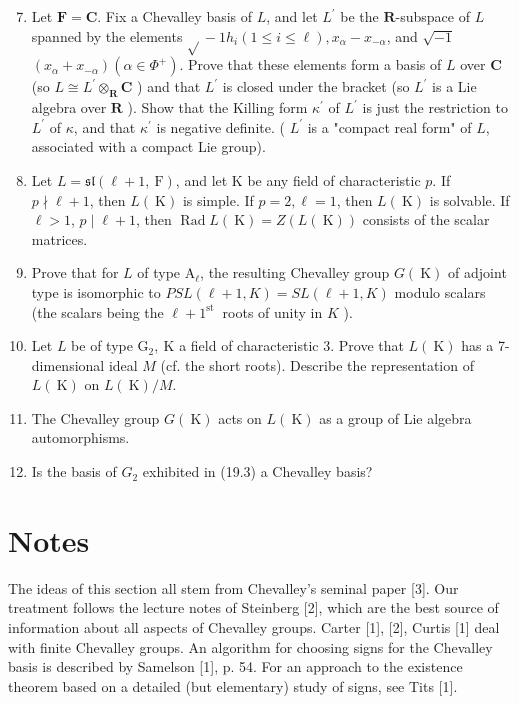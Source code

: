 \documentclass[10pt]{article}
\begin{document}
\begin{enumerate}
  \setcounter{enumi}{6}
  \item Let $\mathbf{F}=\mathbf{C}$. Fix a Chevalley basis of $L$, and let $L^{\prime}$ be the $\mathbf{R}$-subspace of $L$ spanned by the elements $\sqrt{ }-1 h_{i}(1 \leq i \leq \ell), x_{\alpha}-x_{-\alpha}$, and $\sqrt{-1}$ $\left(x_{\alpha}+x_{-\alpha}\right)\left(\alpha \in \Phi^{+}\right)$. Prove that these elements form a basis of $L$ over $\mathbf{C}$ (so $L \cong L^{\prime} \otimes_{\mathbf{R}} \mathbf{C}$ ) and that $L^{\prime}$ is closed under the bracket (so $L^{\prime}$ is a Lie algebra over $\mathbf{R}$ ). Show that the Killing form $\kappa^{\prime}$ of $L^{\prime}$ is just the restriction to $L^{\prime}$ of $\kappa$, and that $\kappa^{\prime}$ is negative definite. ( $L^{\prime}$ is a "compact real form" of $L$, associated with a compact Lie group).
  \item Let $L=\mathfrak{s l}(\ell+1, \mathrm{~F})$, and let K be any field of characteristic $p$. If $p \nmid \ell+1$, then $L(\mathrm{~K})$ is simple. If $p=2, \ell=1$, then $L(\mathrm{~K})$ is solvable. If $\ell>1$, $p \mid \ell+1$, then $\operatorname{Rad} L(\mathrm{~K})=Z(L(\mathrm{~K}))$ consists of the scalar matrices.
  \item Prove that for $L$ of type $\mathrm{A}_{\ell}$, the resulting Chevalley group $G(\mathrm{~K})$ of adjoint type is isomorphic to $P S L(\ell+1, K)=S L(\ell+1, K)$ modulo scalars (the scalars being the $\ell+1^{\text {st }}$ roots of unity in $K$ ).
  \item Let $L$ be of type $\mathrm{G}_{2}, \mathrm{~K}$ a field of characteristic 3. Prove that $L(\mathrm{~K})$ has a 7-dimensional ideal $M$ (cf. the short roots). Describe the representation of $L(\mathrm{~K})$ on $L(\mathrm{~K}) / M$.
  \item The Chevalley group $G(\mathrm{~K})$ acts on $L(\mathrm{~K})$ as a group of Lie algebra automorphisms.
  \item Is the basis of $G_{2}$ exhibited in (19.3) a Chevalley basis?
\end{enumerate}

\section*{Notes}
The ideas of this section all stem from Chevalley's seminal paper [3]. Our treatment follows the lecture notes of Steinberg [2], which are the best source of information about all aspects of Chevalley groups. Carter [1], [2], Curtis [1] deal with finite Chevalley groups. An algorithm for choosing signs for the Chevalley basis is described by Samelson [1], p. 54. For an approach to the existence theorem based on a detailed (but elementary) study of signs, see Tits [1].
\end{document}
